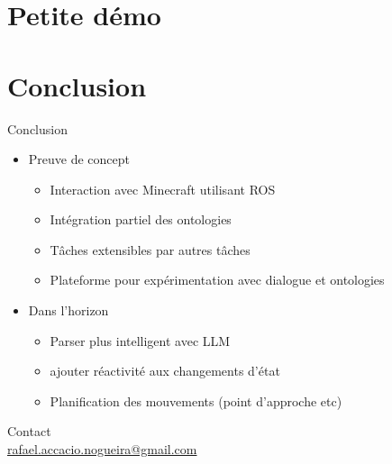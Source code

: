 \documentclass[aspectratio=169]{audition-beamer}
\begin{document}
\section{Petite démo}

\section{Conclusion}

\begin{frame}{Conclusion}
  \begin{itemize}[<+->]
    \item Preuve de concept
          \begin{itemize}[<+->]
            \item Interaction avec Minecraft utilisant ROS
            \item Intégration partiel des ontologies
            \item Tâches extensibles par autres tâches
            \item Plateforme pour expérimentation avec dialogue et ontologies
          \end{itemize}
  \end{itemize}

  \begin{itemize}[<+->]
    \item Dans l'horizon
          \begin{itemize}[<+->]
            \item Parser plus intelligent avec LLM
            \item ajouter réactivité aux changements d'état
            \item Planification des mouvements (point d'approche etc)
          \end{itemize}
  \end{itemize}
\end{frame}

\begin{frame}[plain]
  \centering
  \vfill
  \begin{minipage}[t]{.5\linewidth}
    \small
    \centering
    Contact\\
    \href{mailto:rafael.accacio.nogueira@gmail.com?subject=Seminaire RIS Minecraft}{rafael.accacio.nogueira@gmail.com}

    \vspace{10pt}
  \end{minipage}
  \fi
\end{frame}

\appendix
\end{document}
